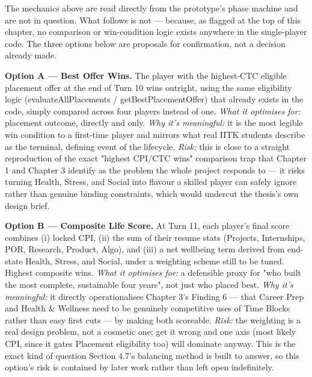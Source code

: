 The mechanics above are read directly from the prototype's phase machine and are not in question. What follows is not --- because, as flagged at the top of this chapter, no comparison or win-condition logic exists anywhere in the single-player code. The three options below are proposals for confirmation, not a decision already made.

\textbf{Option A --- Best Offer Wins.} The player with the highest-CTC eligible placement offer at the end of Turn 10 wins outright, using the same eligibility logic (evaluateAllPlacements / getBestPlacementOffer) that already exists in the code, simply compared across four players instead of one. \emph{What it optimises for:} placement outcome, directly and only. \emph{Why it's meaningful:} it is the most legible win condition to a first-time player and mirrors what real IITK students describe as the terminal, defining event of the lifecycle. \emph{Risk:} this is close to a straight reproduction of the exact "highest CPI/CTC wins" comparison trap that Chapter 1 and Chapter 3 identify as the problem the whole project responds to --- it risks turning Health, Stress, and Social into flavour a skilled player can safely ignore rather than genuine binding constraints, which would undercut the thesis's own design brief.

\textbf{Option B --- Composite Life Score.} At Turn 11, each player's final score combines (i) locked CPI, (ii) the sum of their resume stats (Projects, Internships, POR, Research, Product, Algo), and (iii) a net wellbeing term derived from end-state Health, Stress, and Social, under a weighting scheme still to be tuned. Highest composite wins. \emph{What it optimises for:} a defensible proxy for "who built the most complete, sustainable four years", not just who placed best. \emph{Why it's meaningful:} it directly operationalises Chapter 3's Finding 6 --- that Career Prep and Health \& Wellness need to be genuinely competitive uses of Time Blocks rather than easy first cuts --- by making both scoreable. \emph{Risk:} the weighting is a real design problem, not a cosmetic one; get it wrong and one axis (most likely CPI, since it gates Placement eligibility too) will dominate anyway. This is the exact kind of question Section 4.7's balancing method is built to answer, so this option's risk is contained by later work rather than left open indefinitely.

